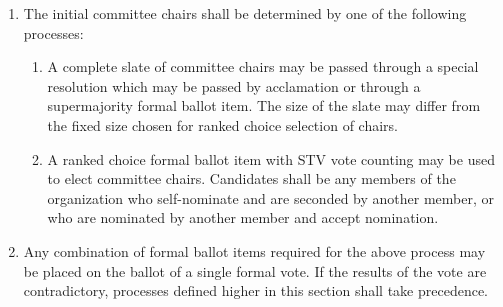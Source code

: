 \documentclass[11pt]{article}
\newcounter{h1}
\newcounter{h2}[h1]
\newcounter{h3}[h2]
\begin{document}
\begin{enumerate}
\begin{enumerate}
    \begin{enumerate}
      \item Unless the creation of the committee is tied to the expiry of another committee, if a committee's creation is delayed by further than 42 days, it shall no longer be created.
      \item Time which passes during the delay period shall not count toward limits on the lifespan of a committee.
    \end{enumerate}
  \end{enumerate}
  \item The initial committee chairs shall be determined by one of the following processes:
  \begin{enumerate}
    \item A complete slate of committee chairs may be passed through a special resolution which may be passed by acclamation or through a supermajority formal ballot item. The size of the slate may differ from the fixed size chosen for ranked choice selection of chairs.
    \item A ranked choice formal ballot item with STV vote counting may be used to elect committee chairs. Candidates shall be any members of the organization who self-nominate and are seconded by another member, or who are nominated by another member and accept nomination.
  \end{enumerate}
  \item Any combination of formal ballot items required for the above process may be placed on the ballot of a single formal vote. If the results of the vote are contradictory, processes defined higher in this section shall take precedence.
\end{enumerate}

\end{document}

